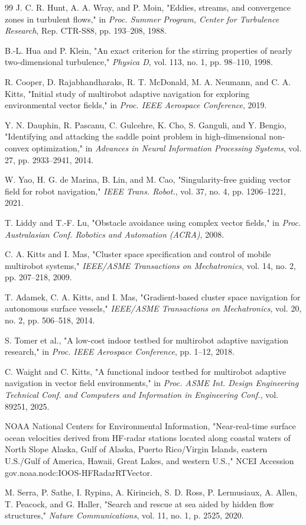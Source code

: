 \documentclass[lettersize,journal]{IEEEtran}
\begin{document}
\begin{thebibliography}{99}
 J. C. R. Hunt, A. A. Wray, and P. Moin, "Eddies, streams, and
convergence zones in turbulent flows," in \textit{Proc. Summer Program,
Center for Turbulence Research}, Rep. CTR-S88, pp. 193--208, 1988.

 B.-L. Hua and P. Klein, "An exact criterion for the stirring
properties of nearly two-dimensional turbulence," \textit{Physica D}, vol. 113,
no. 1, pp. 98--110, 1998.

 R. Cooper, D. Rajabhandharaks, R. T. McDonald, M. A. Neumann,
and C. A. Kitts, "Initial study of multirobot adaptive
navigation for exploring environmental vector fields," in \textit{Proc.
IEEE Aerospace Conference}, 2019.

 Y. N. Dauphin, R. Pascanu, C. Gulcehre, K. Cho, S. Ganguli,
and Y. Bengio, "Identifying and attacking the saddle point problem in
high-dimensional non-convex optimization," in \textit{Advances in Neural
Information Processing Systems}, vol. 27, pp. 2933--2941, 2014.

 W. Yao, H. G. de Marina, B. Lin, and M. Cao,
"Singularity-free guiding vector field for robot navigation,"
\textit{IEEE Trans. Robot.}, vol. 37, no. 4, pp. 1206--1221, 2021.

 T. Liddy and T.-F. Lu, "Obstacle avoidance using complex
vector fields," in \textit{Proc. Australasian Conf. Robotics and
Automation (ACRA)}, 2008.

 C. A. Kitts and I. Mas, "Cluster space specification and control
of mobile multirobot systems," \textit{IEEE/ASME Transactions on Mechatronics},
vol. 14, no. 2, pp. 207--218, 2009.

 T. Adamek, C. A. Kitts, and I. Mas, "Gradient-based cluster space
navigation for autonomous surface vessels," \textit{IEEE/ASME Transactions on
Mechatronics}, vol. 20, no. 2, pp. 506--518, 2014.

 S. Tomer et al., "A low-cost indoor testbed for multirobot
adaptive navigation research," in \textit{Proc. IEEE Aerospace Conference},
pp. 1--12, 2018.

 C. Waight and C. Kitts, "A functional indoor testbed for
multirobot adaptive navigation in vector field environments," in
\textit{Proc. ASME Int. Design Engineering Technical Conf. and Computers
and Information in Engineering Conf.}, vol. 89251, 2025.

 NOAA National Centers for Environmental Information,
"Near-real-time surface ocean velocities derived from HF-radar stations
located along coastal waters of North Slope Alaska, Gulf of Alaska,
Puerto Rico/Virgin Islands, eastern U.S./Gulf of America, Hawaii, Great
Lakes, and western U.S.," NCEI Accession
gov.noaa.nodc:IOOS-HFRadarRTVector.

 M. Serra, P. Sathe, I. Rypina, A. Kirincich, S. D. Ross,
P. Lermusiaux, A. Allen, T. Peacock, and G. Haller, "Search and rescue
at sea aided by hidden flow structures," \textit{Nature Communications},
vol. 11, no. 1, p. 2525, 2020.

\end{thebibliography}
\end{document}
